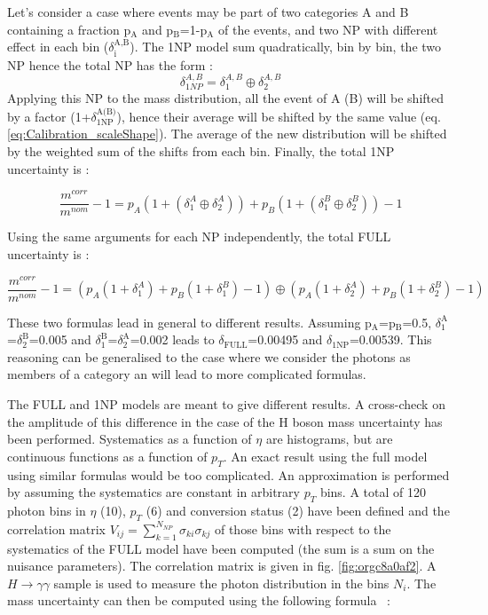 \begin{enumerate}
\begin{enumerate}
Let's consider a case where events may be part of two categories A and B containing a fraction p\(_{\text{A}}\) and p\(_{\text{B}}\)=1-p\(_{\text{A}}\) of the events, and two NP with different effect in each bin (\(\delta_{\text{i}}^{\text{A,B}}\)).
The 1NP model sum quadratically, bin by bin, the two NP hence the total NP has the form :
\begin{equation}
\delta_{1NP}^{A,B} = \delta_1^{A,B} \oplus \delta_2^{A,B}
\end{equation}
Applying this NP to the mass distribution, all the event of A (B) will be shifted by a factor (1+\(\delta_{\text{1NP}}^{\text{A(B)}}\)), hence their average will be shifted by the same value (eq. \ref{eq:Calibration_scaleShape}).
The average of the new distribution will be shifted by the weighted sum of the shifts from each bin.
Finally, the total 1NP uncertainty is :

\begin{equation}
    \frac{m^{corr}}{m^{nom}} -1 = p_A(1+(\delta_{1}^A\oplus \delta_{2}^A )) + p_B(1+(\delta_{1}^B\oplus \delta_{2}^B)) -1
\end{equation}

Using the same arguments for each NP independently, the total FULL uncertainty is :

\begin{equation}
  \frac{m^{corr}}{m^{nom}} -1 =\left(p_A(1+\delta_{1}^A) + p_B(1+\delta_{1}^B) -1 \right) \oplus \left( p_A(1+\delta_{2}^A) + p_B(1+\delta_{2}^B) -1 \right)
\end{equation}

These two formulas lead in general to different results.
Assuming p\(_{\text{A}}\)=p\(_{\text{B}}\)=0.5, \(\delta_{\text{1}}^{\text{A}}\)=\(\delta_{\text{2}}^{\text{B}}\)=0.005 and \(\delta_{\text{1}}^{\text{B}}\)=\(\delta_{\text{2}}^{\text{A}}\)=0.002 leads to \(\delta_{\text{FULL}}\)=0.00495 and \(\delta_{\text{1NP}}\)=0.00539.
This reasoning can be generalised to the case where we consider the photons as members of a category an will lead to more complicated formulas.

The FULL and 1NP models are meant to give different results.
A cross-check on the amplitude of this difference in the case of the H boson mass uncertainty has been performed.
Systematics as a function of $\eta$ are histograms, but are continuous functions as a function of $p_T$.
An exact result using the full model using similar formulas would be too complicated.
An approximation is performed by assuming the systematics are constant in arbitrary $p_T$ bins.
A total of 120 photon bins in $\eta$ (10), $p_T$ (6) and conversion status (2) have been defined and the correlation matrix $V_{ij} = \sum_{k=1}^{N_{NP}} \sigma_{ki}\sigma_{kj}$ of those bins with respect to the systematics of the FULL model have been computed (the sum is a sum on the nuisance parameters).
The correlation matrix  is given in fig. \ref{fig:orgc8a0af2}.
A $H\rightarrow\gamma\gamma$ sample is used to measure the photon distribution in the bins \(N_i\).
The mass uncertainty can then be computed using the following formula \cite{170125_Goudet}~:


\end{enumerate}
\end{enumerate}
